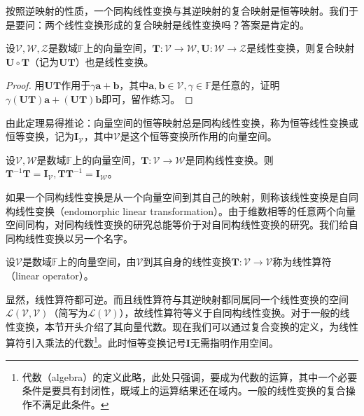 \documentclass[main.tex]{subfiles}
\begin{document}
按照逆映射的性质，一个同构线性变换与其逆映射的复合映射是恒等映射。我们于是要问：两个线性变换形成的复合映射是线性变换吗？答案是肯定的。

\begin{theorem}\label{thm:II.4.7}
设$\mathcal{V},\mathcal{W},\mathcal{Z}$是数域$\mathbb{F}$上的向量空间，$\mathbf{T}:\mathcal{V}\rightarrow\mathcal{W},\mathbf{U}:\mathcal{W}\rightarrow\mathcal{Z}$是线性变换，则复合映射$\mathbf{U}\circ\mathbf{T}$（记为$\mathbf{UT}$）也是线性变换。
\end{theorem}
\begin{proof}
用$\mathbf{UT}$作用于$\gamma\mathbf{a}+\mathbf{b}$，其中$\mathbf{a},\mathbf{b}\in\mathcal{V},\gamma\in\mathbb{F}$是任意的，证明$\gamma\left(\mathbf{UT}\right)\mathbf{a}+\left(\mathbf{UT}\right)\mathbf{b}$即可，留作练习。
\end{proof}

由此定理易得推论：向量空间的恒等映射总是同构线性变换，称为恒等线性变换或恒等变换，记为$\mathbf{I}_\mathcal{V}$，其中$\mathcal{V}$是这个恒等变换所作用的向量空间。

\begin{example}
设$\mathcal{V},\mathcal{W}$是数域$\mathbb{F}$上的向量空间，$\mathbf{T}:\mathcal{V}\rightarrow\mathcal{W}$是同构线性变换。则$\mathbf{T}^{-1}\mathbf{T}=\mathbf{I}_\mathcal{V},\mathbf{TT}^{-1}=\mathbf{I}_\mathcal{W}$。
\end{example}

如果一个同构线性变换是从一个向量空间到其自己的映射，则称该线性变换是自同构线性变换（endomorphic linear transformation）。由于维数相等的任意两个向量空间同构，对同构线性变换的研究总能等价于对自同构线性变换的研究。我们给自同构线性变换以另一个名字。

\begin{definition}[线性算符]\label{def:II.4.3}
设$\mathcal{V}$是数域$\mathbb{F}$上的向量空间，由$\mathcal{V}$到其自身的线性变换$\mathbf{T}:\mathcal{V}\rightarrow\mathcal{V}$称为线性算符（linear operator）。
\end{definition}

显然，线性算符都可逆。而且线性算符与其逆映射都同属同一个线性变换的空间$\mathcal{L}\left(\mathcal{V},\mathcal{V}\right)$（简写为$\mathcal{L}\left(\mathcal{V}\right)$），故线性算符等义于自同构线性变换。对于一般的线性变换，本节开头介绍了其向量代数。现在我们可以通过复合变换的定义，为线性算符引入乘法的代数\footnote{代数（algebra）的定义此略，此处只强调，要成为代数的运算，其中一个必要条件是要具有封闭性，既域上的运算结果还在域内。一般的线性变换的复合操作不满足此条件。}。此时恒等变换记号$\mathbf{I}$无需指明作用空间。
\end{document}
